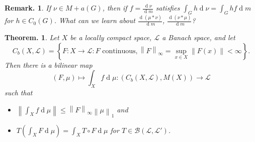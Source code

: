 \documentclass[11pt, a4paper]{memoir}
\newcommand{\norm}[1]{\ensuremath{\left\lVert#1\right\rVert}}
\theoremstyle{change}
\newtheorem{theorem}{Theorem.}[section]
\theoremstyle{plain}
\theoremstyle{nonumberplain}
\newtheorem{remark}{Remark.}
\renewcommand{\d}[1]{\ensuremath{\operatorname{d}\!{#1}}}
\numberwithin{equation}{section}
\begin{document}
\begin{remark}
    If $\nu\in M+a(G)$, then if $f=\frac{\d{\nu}}{\d{m}}$ satisfies $\int_G h\d{\nu}=\int_G hf\d{m}$ for $h\in C_0(G)$.
    What can we learn about $\frac{\d{(\mu*\nu)}}{\d{m}}$, $\frac{\d{(\nu*\mu)}}{\d{m}}$?
\end{remark}
\begin{theorem}
    Let $X$ be a locally compact space, $\mathcal{L}$ a Banach space, and let
    \begin{equation*}
        C_b(X,\mathcal{L}) =\left\{F:X\to\mathcal{L}:F\text{ continuous},\norm{F}_\infty=\sup_{x\in X}\norm{F(x)}<\infty\right\}.
    \end{equation*}
    Then there is a bilinear map
    \begin{equation*}
        (F,\mu)\mapsto\int_X f\d{\mu}:(C_b(X,\mathcal{L}),M(X))\to\mathcal{L}
    \end{equation*}
    such that
    \begin{itemize}[nl]
        \item $\norm{\int_X f\d{\mu}}\leq\norm{F}_\infty\norm{\mu}_1$ and
        \item $T\left(\int_X F\d{\mu}\right)=\int_X T\circ F\d{\mu}$ for $T\in\mathcal{B}(\mathcal{L},\mathcal{L}')$.
    \end{itemize}
\end{theorem}
\end{document}
